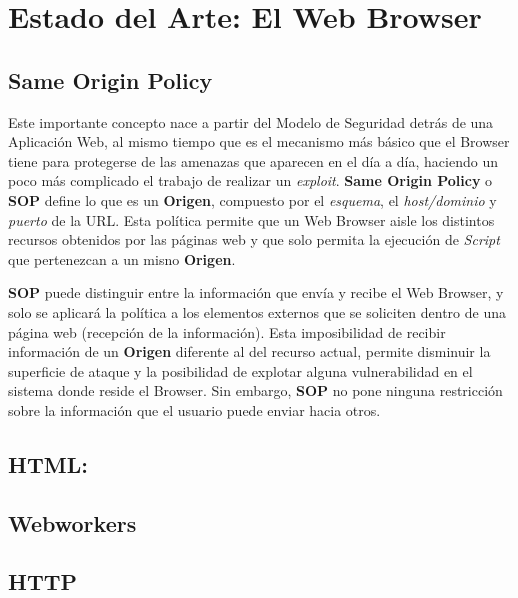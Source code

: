 \chapter{Estado del Arte: El Web Browser}
\label{chap:chap2}

\section{Same Origin Policy}
\label{chap:SOP}

Este importante concepto nace a partir del Modelo de Seguridad detrás de una Aplicación Web, al mismo tiempo que es el mecanismo más básico que el Browser tiene para protegerse de las amenazas que aparecen en el día a día, haciendo un poco más complicado el trabajo de realizar un \textit{exploit}. \textbf{Same Origin Policy} o \textbf{SOP} define lo que es un \textbf{Origen}, compuesto por el \textit{esquema}, el \textit{host/dominio} y \textit{puerto} de la URL. Esta política permite que un Web Browser aisle los distintos recursos obtenidos por las páginas web y que solo permita la ejecución de \textit{Script} que pertenezcan a un misno \textbf{Origen}. 

\textbf{SOP} puede distinguir entre la información que envía y recibe el Web Browser, y solo se aplicará la política a los elementos externos que se soliciten dentro de una página web (recepción de la información). Esta imposibilidad de recibir información de un \textbf{Origen} diferente al del recurso actual, permite disminuir la superficie de ataque y la posibilidad de explotar alguna vulnerabilidad en el sistema donde reside el Browser. Sin embargo, \textbf{SOP} no pone ninguna restricción sobre la información que el usuario puede enviar hacia otros. 



\section{HTML:}
\label{chap:HTML}

\section{Webworkers}

\section{}

\section{HTTP}
\label{chap:HTTP}

